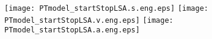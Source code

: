 \documentclass[a4paper,12pt]{article}
\begin{document}

\begin{center}
\texttt{[image: PTmodel\_startStopLSA.s.eng.eps]} 
\texttt{[image: PTmodel\_startStopLSA.v.eng.eps]}
\texttt{[image: PTmodel\_startStopLSA.a.eng.eps]}
\end{center}

\end{document}
